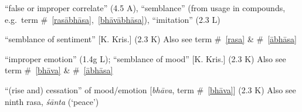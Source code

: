 \documentclass[10pt]{article}
\begin{document}
\begin{multicols}{2}
\begin{enumerate}[
			leftmargin=0em,
			rightmargin=0em,
		]
		 ``false or improper correlate'' (4.5 A),
		``semblance'' (from usage in compounds, e.g.\ term \#~\ref{rasābhāsa},~\ref{bhāvābhāsa}),
		``imitation'' (2.3 L)

		 ``semblance of sentiment'' [K. Kris.] (2.3 K)
		Also see term \#~\ref{rasa} \& \#~\ref{ābhāsa}

		 ``improper emotion'' (1.4g L);
		``semblance of mood'' [K. Kris.] (2.3 K)
		Also see term \#~\ref{bhāva} \& \#~\ref{ābhāsa}

		 ``(rise and) cessation'' of mood/emotion [\textit{bhāva}, term \#~\ref{bhāva}] (2.3 K) Also see ninth rasa, \textit{śānta} (`peace')

\end{enumerate}
\end{multicols}
\end{document}
